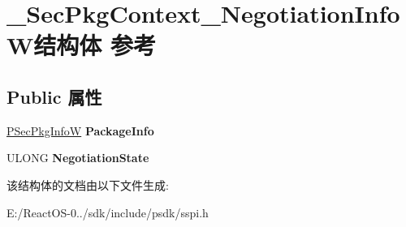 \hypertarget{struct___sec_pkg_context___negotiation_info_w}{}\section{\+\_\+\+Sec\+Pkg\+Context\+\_\+\+Negotiation\+Info\+W结构体 参考}
\label{struct___sec_pkg_context___negotiation_info_w}
\subsection*{Public 属性}
\begin{DoxyCompactItemize}
\item 
\mbox{\label{struct___sec_pkg_context___negotiation_info_w_ab6aea8c74d287dcf8c070fe87c6a0bf2}} 
\hyperlink{struct___sec_pkg_info_w}{P\+Sec\+Pkg\+InfoW} {\bfseries Package\+Info}
\item 
\mbox{\label{struct___sec_pkg_context___negotiation_info_w_abac9aacd15aee1156ce9bd0f1352eb3c}} 
U\+L\+O\+NG {\bfseries Negotiation\+State}
\end{DoxyCompactItemize}


该结构体的文档由以下文件生成\+:\begin{DoxyCompactItemize}
\item 
E\+:/\+React\+O\+S-\/0../sdk/include/psdk/sspi.\+h\end{DoxyCompactItemize}
